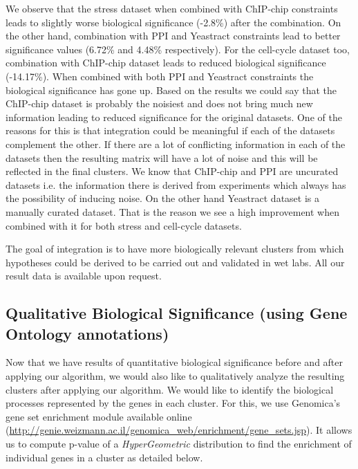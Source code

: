 We observe that the stress dataset when combined with ChIP-chip constraints leads to 
slightly worse biological significance (-2.8\%) after the combination. On the other hand, combination with PPI and Yeastract constraints lead to better significance values (6.72\% and 4.48\% respectively). For 
the cell-cycle dataset too, combination with ChIP-chip dataset leads to reduced biological significance (-14.17\%). When combined with both PPI and Yeastract constraints the biological significance 
has gone up. Based on the results we could say that the ChIP-chip dataset is probably the noisiest and does not bring much new information leading to reduced significance for the original datasets. 
One of the reasons for this is that integration could be meaningful if each of the datasets complement the other. If there are 
a lot of conflicting information in each of the datasets then the resulting matrix will have a lot of noise and this will be reflected in the final clusters. We know that ChIP-chip and PPI are uncurated datasets i.e. the information there is derived from experiments which always has the possibility of inducing noise. On the other hand Yeastract 
dataset is a manually curated dataset. That is the reason we see a high improvement when combined with it for both stress and cell-cycle datasets. 
  
The goal of integration is to have more biologically relevant clusters from which hypotheses could be derived to be carried out and validated in wet labs. All our result data is available upon request. 

\subsection{Qualitative Biological Significance (using Gene Ontology annotations)} \label{semisup_biosig_go}
Now that we have results of quantitative biological significance before and after applying our algorithm, we would also like to qualitatively analyze the resulting clusters after 
applying our algorithm. We would like to identify the biological processes represented by the genes in each cluster. For this, we use Genomica's gene set enrichment module available online (\url{http://genie.weizmann.ac.il/genomica_web/enrichment/gene_sets.jsp}). It allows us to compute 
p-value of a \textit{HyperGeometric} distribution to find the enrichment of individual genes in a cluster as detailed below.

